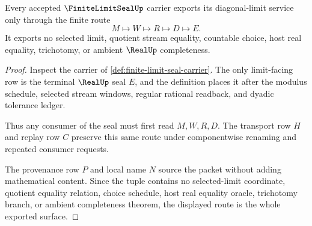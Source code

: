 \begin{theorem}
\label{thm:finite-limit-seal-route-nonescape}
Every accepted $\FiniteLimitSealUp$ carrier exports its diagonal-limit service only through the finite route
$$
M \longmapsto W \longmapsto R \longmapsto D \longmapsto E .
$$
It exports no selected limit, quotient stream equality, countable choice, host real equality, trichotomy, or ambient $\RealUp$ completeness.
\end{theorem}
\begin{proof}
Inspect the carrier of \autoref{def:finite-limit-seal-carrier}. The only limit-facing row is the terminal $\RealUp$ seal $E$, and the definition places it after the modulus schedule, selected stream windows, regular rational readback, and dyadic tolerance ledger.

Thus any consumer of the seal must first read $M,W,R,D$. The transport row $H$ and replay row $C$ preserve this same route under componentwise renaming and repeated consumer requests.

The provenance row $P$ and local name $N$ source the packet without adding mathematical content. Since the tuple contains no selected-limit coordinate, quotient equality relation, choice schedule, host real equality oracle, trichotomy branch, or ambient completeness theorem, the displayed route is the whole exported surface.
\end{proof}

